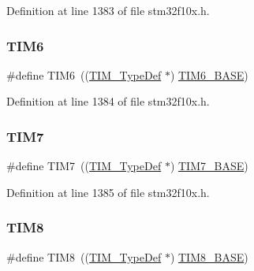 Definition at line 1383 of file stm32f10x.\+h.

\mbox{\label{group___peripheral__declaration_gac7b4ed55f9201b498b38c962cca97314}} 
\subsubsection{\texorpdfstring{T\+I\+M6}{TIM6}}
{\footnotesize\ttfamily \#define T\+I\+M6~((\hyperlink{struct_t_i_m___type_def}{T\+I\+M\+\_\+\+Type\+Def} $\ast$) \hyperlink{group___peripheral__memory__map_ga8268ec947929f192559f28c6bf7d1eac}{T\+I\+M6\+\_\+\+B\+A\+SE})}



Definition at line 1384 of file stm32f10x.\+h.

\mbox{\label{group___peripheral__declaration_ga49267c49946fd61db6af8b49bcf16394}} 
\subsubsection{\texorpdfstring{T\+I\+M7}{TIM7}}
{\footnotesize\ttfamily \#define T\+I\+M7~((\hyperlink{struct_t_i_m___type_def}{T\+I\+M\+\_\+\+Type\+Def} $\ast$) \hyperlink{group___peripheral__memory__map_ga0ebf54364c6a2be6eb19ded6b18b6387}{T\+I\+M7\+\_\+\+B\+A\+SE})}



Definition at line 1385 of file stm32f10x.\+h.

\mbox{\label{group___peripheral__declaration_ga9a3660400b17735e91331f256095810e}} 
\subsubsection{\texorpdfstring{T\+I\+M8}{TIM8}}
{\footnotesize\ttfamily \#define T\+I\+M8~((\hyperlink{struct_t_i_m___type_def}{T\+I\+M\+\_\+\+Type\+Def} $\ast$) \hyperlink{group___peripheral__memory__map_ga5b72f698b7a048a6f9fcfe2efe5bc1db}{T\+I\+M8\+\_\+\+B\+A\+SE})}



